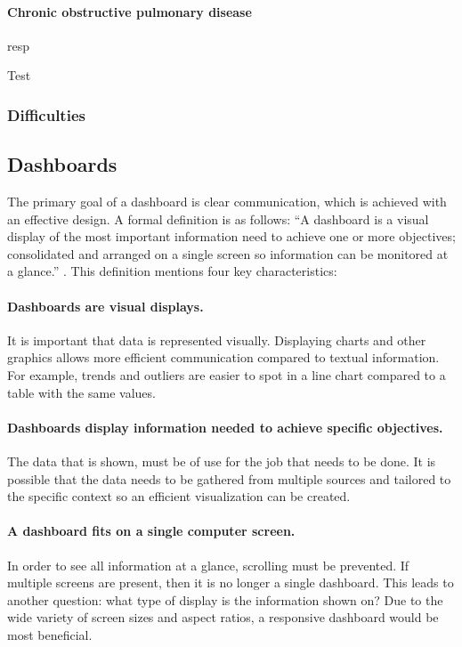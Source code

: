         \paragraph{Chronic obstructive pulmonary disease} resp

        \noindent Test


        \subsubsection{Difficulties}

    \subsection{Dashboards} \label{2_dashboards}

    The primary goal of a dashboard is clear communication, which is achieved with an effective design. A formal definition is as follows: ``A dashboard is a visual display of the most important information need to achieve one or more objectives; consolidated and arranged on a single screen so information can be monitored at a glance.'' \cite{dashboard}. This definition mentions four key characteristics:

    \paragraph{Dashboards are visual displays.} It is important that data is represented visually. Displaying charts and other graphics allows more efficient communication compared to textual information. For example, trends and outliers are easier to spot in a line chart compared to a table with the same values.

    \paragraph{Dashboards display information needed to achieve specific objectives.} The data that is shown, must be of use for the job that needs to be done. It is possible that the data needs to be gathered from multiple sources and tailored to the specific context so an efficient visualization can be created.

    \paragraph{A dashboard fits on a single computer screen.} In order to see all information at a glance, scrolling must be prevented. If multiple screens are present, then it is no longer a single dashboard. This leads to another question: what type of display is the information shown on? Due to the wide variety of screen sizes and aspect ratios, a responsive dashboard would be most beneficial.

